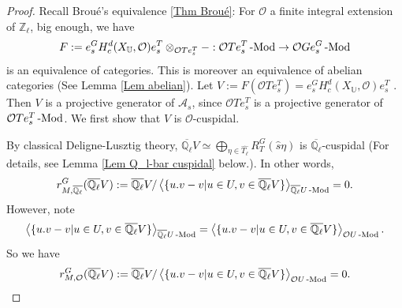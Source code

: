 	\begin{proof}
		
		Recall Broué's equivalence \ref{Thm Broué}: For $\mathcal{O}$ a finite integral extension of $\mathbb{Z}_{\ell}$, big enough, we have
		$$F:=e_s^GH^d_c(X_{\mathbb{U}}, \mathcal{O})e_s^T\otimes_{\mathcal{O}Te_s^T}-: \mathcal{O}Te_s^T\operatorname{-Mod} \to \mathcal{O}Ge_s^G\operatorname{-Mod}$$ is an equivalence of categories. This is moreover an equivalence of abelian categories (See Lemma \ref{Lem abelian}). Let $V:=F(\mathcal{O}Te_s^T)=e_s^GH^d_c(X_{\mathbb{U}}, \mathcal{O})e_s^T$ %
		. Then $V$ is a projective generator of $\mathcal{A}_s$, since $\mathcal{O}Te_s^T$ is a projective generator of $\mathcal{O}Te_s^T\operatorname{-Mod}$. We first show that $V$ is $\mathcal{O}$-cuspidal.
		
		By classical Deligne-Lusztig theory, $\overline{\mathbb{Q}_{\ell}}V \simeq \bigoplus_{\eta \in \hat{T_{\ell}}}R_T^G(\hat{s}\eta)$ 
		is $\overline{\mathbb{Q}_{\ell}}$-cuspidal (For details, see Lemma \ref{Lem Q_l-bar cuspidal} below.). 
		In other words, 
		$$r^G_{M, \overline{\mathbb{Q}_{\ell}}}(\overline{\mathbb{Q}_{\ell}}V):=\overline{\mathbb{Q}_{\ell}}V/\left<\{u.v-v | u \in U, v \in \overline{\mathbb{Q}_{\ell}}V\}\right>_{\overline{\mathbb{Q}_{\ell}}U\operatorname{-Mod}}=0.$$
		However, note  
		$$\left<\{u.v-v | u \in U, v \in \overline{\mathbb{Q}_{\ell}}V\}\right>_{\overline{\mathbb{Q}_{\ell}}U\operatorname{-Mod}}=\left<\{u.v-v | u \in U, v \in \overline{\mathbb{Q}_{\ell}}V\}\right>_{\mathcal{O}U\operatorname{-Mod}}.$$
		So we have 
		$$r^G_{M, \mathcal{O}}(\overline{\mathbb{Q}_{\ell}}V):=\overline{\mathbb{Q}_{\ell}}V/\left<\{u.v-v | u \in U, v \in \overline{\mathbb{Q}_{\ell}}V\}\right>_{\mathcal{O}U\operatorname{-Mod}}=0.$$
		

\end{proof}
